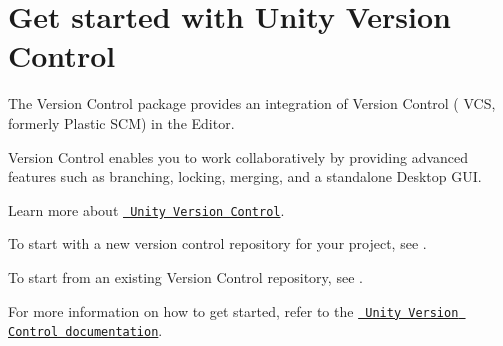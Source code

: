 \chapter{Get started with Unity Version Control}
\hypertarget{md__library_2_package_cache_2com_8unity_8collab-proxy_0d2_83_81_2_documentation_0i_2_get_started}{}\label{md__library_2_package_cache_2com_8unity_8collab-proxy_0d2_83_81_2_documentation_0i_2_get_started}
\label{md__library_2_package_cache_2com_8unity_8collab-proxy_0d2_83_81_2_documentation_0i_2_get_started_autotoc_md131}%
%
 The Version Control package provides an integration of  Version Control ( VCS, formerly Plastic SCM) in the  Editor.

 Version Control enables you to work collaboratively by providing advanced features such as branching, locking, merging, and a standalone Desktop GUI.

Learn more about \href{https://unity.com/solutions/version-control}{\texttt{ Unity Version Control}}.


\begin{DoxyItemize}
\item To start with a new version control repository for your project, see .
\item To start from an existing  Version Control repository, see .
\end{DoxyItemize}

For more information on how to get started, refer to the \href{https://docs.unity.com/ugs/en-us/manual/devops/manual/unity-version-control}{\texttt{ Unity Version Control documentation}}. 